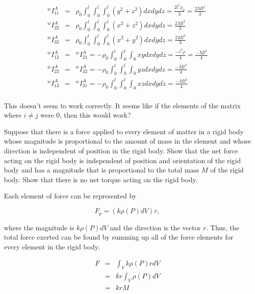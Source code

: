 \documentclass[11pt]{article}
\begin{document}
{\begin{ps}
\begin{eqnarray*}
{}^wI^A_{11} & = & \rho_0\int_0^l\int_0^l\int_0^l(y^2+z^2)dxdydz = \frac{2l^5\rho_0}{3} = \frac{2Ml^2}{3} \\
{}^wI^A_{22} & = & \rho_0\int_0^l\int_0^l\int_0^l(x^2+z^2)dxdydz = \frac{2Ml^2}{3} \\
{}^wI^A_{33} & = & \rho_0\int_0^l\int_0^l\int_0^l(x^2+y^2)dxdydz = \frac{2Ml^2}{3} \\
{}^wI^A_{12} & = & {}^wI^A_{21} = -\rho_0\int_0^l\int_0^l\int_0xydxdydz = \frac{-l^5\rho}{4} = \frac{-Ml^2}{4} \\
{}^wI^A_{23} & = & {}^wI^A_{32} = -\rho_0\int_0^l\int_0^l\int_0yzdxdydz = \frac{-Ml^2}{4} \\
{}^wI^A_{13} & = & {}^wI^A_{31} = -\rho_0\int_0^l\int_0^l\int_0xzdxdydz = \frac{-Ml^2}{4} \\
\end{eqnarray*}

This doesn't seem to work correctly. It seems like if the elements of the matrix where $i \not = j$ were 0, then this would work?

\end{ps}

\begin{ps}\begin{problemcit}{11.11}Suppose that there is a force applied to every element of matter in a rigid body whose magnitude is proportional to the amount of mass in the element and whose direction is independent of position in the rigid body. Show that the net force acting on the rigid body is independent of position and orientation of the rigid body and has a magnitude that is proportional to the total mass $M$ of the rigid body. Show that there is no net torque acting on the rigid body.\end{problemcit}

Each element of force can be represented by 

\begin{equation*}
F_p = (k\rho(P)dV)r{,}
\end{equation*}

where the magnitude is $k\rho(P)dV$ and the direction is the vector $r$. Thus, the total force exerted can be found by summing up all of the force elements for every element in the rigid body.

\begin{eqnarray*}
F & = & \int_Vk\rho(P)rdV \\
& = & kr\int_V\rho(P)dV \\
& = & krM
\end{eqnarray*}


\end{ps}}
\end{document}
